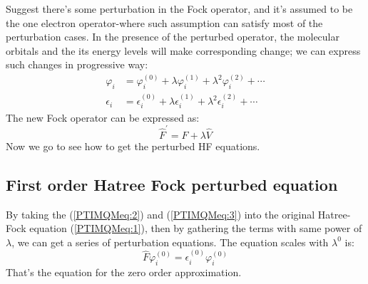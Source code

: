 Suggest there's some perturbation in the Fock operator, and it's
assumed to be the one electron operator-where such assumption can
satisfy most of the perturbation cases. In the presence of the
perturbed operator, the molecular orbitals and the its energy levels
will make corresponding change; we can express such changes in
progressive way:
\begin{align}\label{PTIMQMeq:2}
\varphi_{i} &= \varphi^{(0)}_{i} + \lambda\varphi^{(1)}_{i} +
\lambda^{2}\varphi^{(2)}_{i} + \cdots \nonumber \\
\epsilon_{i} &= \epsilon^{(0)}_{i} + \lambda\epsilon^{(1)}_{i} +
\lambda^{2}\epsilon^{(2)}_{i} + \cdots
\end{align}
The new Fock operator can be expressed as:
\begin{equation}\label{PTIMQMeq:3}
\hat{F}^{'} = \hat{F} + \lambda \hat{V}
\end{equation}
Now we go to see how to get the perturbed HF equations.

\subsection{First order Hatree Fock perturbed equation}
%
%
By taking the (\ref{PTIMQMeq:2}) and (\ref{PTIMQMeq:3}) into the
original Hatree-Fock equation (\ref{PTIMQMeq:1}), then by gathering
the terms with same power of $\lambda$, we can get a series of
perturbation equations. The equation scales with $\lambda^{0}$ is:
\begin{equation}\label{PTIMQMeq:4}
\hat{F}\varphi^{(0)}_{i} = \epsilon^{(0)}_{i}\varphi^{(0)}_{i}
\end{equation}
That's the equation for the zero order approximation.

